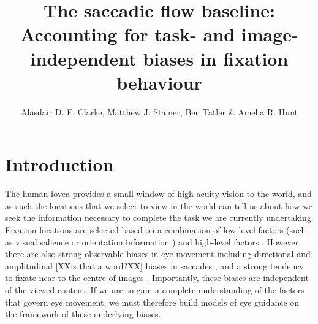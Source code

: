 \documentclass[a4paper, twocolumn, oneside, 10pt]{article}
\title{The saccadic flow baseline: Accounting for task- and image-independent biases in fixation behaviour }
\author{Alasdair D. F. Clarke, Matthew J. Stainer, Ben Tatler \& Amelia R. Hunt}
\begin{document}

\section{Introduction}

The human fovea provides a small window of high acuity vision to the world, and as such the locations that we select to view in the world can tell us about how we seek the information necessary to complete the task we are currently undertaking. Fixation locations are selected based on a combination of low-level factors (such as visual salience \citep{itti-koch2000} or orientation information \citep{baddeley2006}) and high-level factors \citep{yarbus1967, buswell1935, land2001}. However, there are also strong observable biases in eye movement including directional and amplitudinal [XXis that a word?XX] biases in saccades \citep{tatler2008, tatler2009, foulsham2010}, and a strong tendency to fixate near to the centre of images \citep{tatler2007, canosa2003}. Importantly, these biases are independent of the viewed content. If we are to gain a complete understanding of the factors that govern eye movement, we must therefore build models of eye guidance on the framework of these underlying biases.
\end{document}
